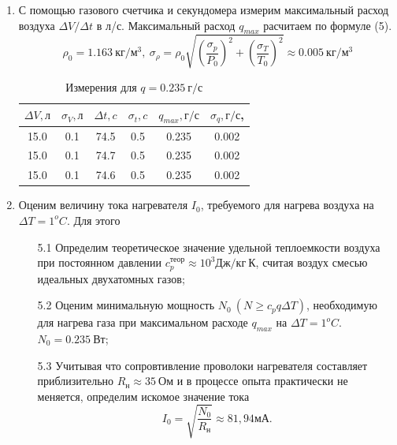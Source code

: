 \documentclass[12pt,a4paper]{article}
\begin{document}
\begin{enumerate}
    \item С помощью газового счетчика и секундомера измерим максимальный расход воздуха $\Delta V / \Delta t$ в л/с. Максимальный расход $q_{max}$ расчитаем по формуле (5).
    \begin{equation*}
        \rho_0 = 1.163\ кг/м^3,\ 
        \sigma_\rho = \rho_0 \sqrt{\left(\frac {\sigma_p}{P_0} \right)^2 + \left(\frac {\sigma_T}{T_0} \right)^2}\approx 0.005 \ кг/м^3
    \end{equation*}
    \begin{table}[ht!]
    \begin{center}
    \begin{tabular}{|c|c|c|c|c|c|}
    \hline
    $\Delta V,  л$ & $\sigma_V, л$ & $\Delta t, c$ & $\sigma_t, c$ & $q_{max}, г/с$ & $\sigma_q, г/с$, \\ \hline
        15.0 &   0.1&  74.5 &   0.5&  0.235 &  0.002     
        \\ \hline
        15.0 &   0.1&  74.7&   0.5&  0.235 &        0.002          
        \\ \hline
        15.0&   0.1&  74.6 &  0.5 &  0.235 &             0.002     
        \\ \hline
    \end{tabular}
    \caption{Измерения для $q=0.235\ г/с$}
    \end{center}
    \end{table}
    \item Оценим величину тока нагревателя $I_0$, требуемого для нагрева воздуха на $\Delta T = 1^oC$. Для этого 
    \begin{enumerate}
        \item [5.1]Определим теоретическое значение удельной теплоемкости воздуха при постоянном давлении $c_p^{теор} \approx 10^3 Дж/кг\ К$, считая воздух смесью идеальных двухатомных газов;
        \item [5.2]Оценим минимальную мощность $N_0\ (N\ge c_p q \Delta T)$, необходимую для нагрева газа при максимальном расходе $q_{max}$ на $\Delta T = 1^oC$. $N_0=0.235\ Вт$;
        \item [5.3]Учитывая что сопровтивление проволоки нагревателя составляет приблизительно $R_н\approx 35\ Ом$ и в процессе опыта практически не меняется, определим искомое значение тока
        \begin{equation*}
            I_0 = \sqrt{\frac {N_0}{R_н}}\approx 81,94мА.
        \end{equation*}
    \end{enumerate}
    

\end{enumerate}
\end{document}
